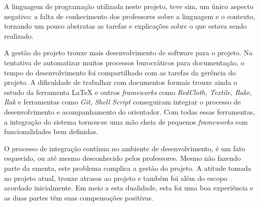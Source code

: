 \documentclass[espaco=simples,appendix=Name]{abnt}
\begin{document}
A linguagem de programação utilizada neste projeto, teve sim, um único aspecto negativo: a falta de conhecimento dos professores sobre a linguagem e o contexto, tornando um pouco abstratas as tarefas e explicações sobre o que estava sendo realizado.

A gestão do projeto trouxe mais desenvolvimento de software para o projeto. Na tentativa de automatizar muitos processos burocráticos para documentação, o tempo do desenvolvimento foi compartilhado com as tarefas da gerência do projeto. A dificuldade de trabalhar com documentos formais trouxe ainda o estudo da ferramenta LaTeX e outros \textit{frameworks} como \textit{RedCloth, Textile, Rake, Rak} e ferramentas como \textit{Git, Shell Script} conseguiram integrar o processo de desenvolvimento e acompanhamento do orientador. Com todas essas ferramentas, a integração do sistema tornou-se uma mão cheia de pequenos \textit{frameworks} com funcionalidades bem definidas.

O processo de integração contínua no ambiente de desenvolvimento, é um fato esquecido, ou até mesmo desconhecido pelos professores. Mesmo não fazendo parte da ementa, este problema complica a gestão do projeto. A atitude tomada no projeto atual, trouxe atrasos ao projeto e também foi além do escopo acordado inicialmente. Em meio a esta dualidade, esta foi uma boa experiência e as duas partes têm suas compensações positivas. 
\end{document}
